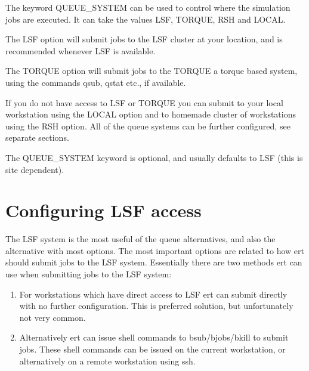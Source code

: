 \documentclass[a4paper,10pt,english]{sphinxmanual}
\begin{document}
\begin{sphinxShadowBox}

The keyword QUEUE\_SYSTEM can be used to control where the simulation jobs are
executed. It can take the values LSF, TORQUE, RSH and LOCAL.

The LSF option will submit jobs to the LSF cluster at your location, and is
recommended whenever LSF is available.

The TORQUE option will submit jobs to the TORQUE a torque based system, using
the commands qsub, qstat etc., if available.

If you do not have access to LSF or TORQUE you can submit to your local
workstation using the LOCAL option and to homemade cluster of workstations
using the RSH option. All of the queue systems can be further configured, see
separate sections.


%
\begin{sphinxVerbatim}[commandchars=\\\{\}]
       
 
\end{sphinxVerbatim}

The QUEUE\_SYSTEM keyword is optional, and usually defaults to LSF (this is
site dependent).
\end{sphinxShadowBox}


\section{Configuring LSF access}
\label{\detokenize{keywords/index:configuring-lsf-access}}\label{\detokenize{keywords/index:id13}}
The LSF system is the most useful of the queue alternatives, and also the
alternative with most options. The most important options are related to how ert
should submit jobs to the LSF system. Essentially there are two methods ert can
use when submitting jobs to the LSF system:
\begin{enumerate}
\item {} 
For workstations which have direct access to LSF ert can submit directly with
no further configuration. This is preferred solution, but unfortunately not
very common.

\item {} 
Alternatively ert can issue shell commands to bsub/bjobs/bkill to submit
jobs. These shell commands can be issued on the current workstation, or
alternatively on a remote workstation using ssh.

\end{enumerate}
\end{document}
